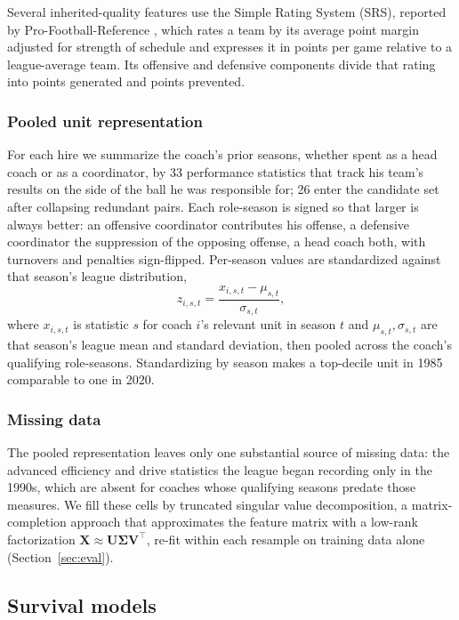 \documentclass[12pt,USenglish]{article}
\begin{document}
Several inherited-quality features use the Simple Rating System (SRS), reported by Pro-Football-Reference \citep{pfr}, which rates a team by its average point margin adjusted for strength of schedule and expresses it in points per game relative to a league-average team. Its offensive and defensive components divide that rating into points generated and points prevented.

\subsubsection{Pooled unit representation}

For each hire we summarize the coach's prior seasons, whether spent as a head coach or as a coordinator, by 33 performance statistics that track his team's results on the side of the ball he was responsible for; 26 enter the candidate set after collapsing redundant pairs. Each role-season is signed so that larger is always better: an offensive coordinator contributes his offense, a defensive coordinator the suppression of the opposing offense, a head coach both, with turnovers and penalties sign-flipped. Per-season values are standardized against that season's league distribution,
\begin{equation}
z_{i,s,t} = \frac{x_{i,s,t} - \mu_{s,t}}{\sigma_{s,t}},
\label{eq:zscore}
\end{equation}
where $x_{i,s,t}$ is statistic $s$ for coach $i$'s relevant unit in season $t$ and $\mu_{s,t}, \sigma_{s,t}$ are that season's league mean and standard deviation, then pooled across the coach's qualifying role-seasons. Standardizing by season makes a top-decile unit in 1985 comparable to one in 2020.

\subsubsection{Missing data}

The pooled representation leaves only one substantial source of missing data: the advanced efficiency and drive statistics the league began recording only in the 1990s, which are absent for coaches whose qualifying seasons predate those measures. We fill these cells by truncated singular value decomposition, a matrix-completion approach that approximates the feature matrix with a low-rank factorization $\mathbf{X} \approx \mathbf{U}\boldsymbol{\Sigma}\mathbf{V}^\top$, re-fit within each resample on training data alone (Section~\ref{sec:eval}).

\subsection{Survival models}
\label{sec:models}
\end{document}
